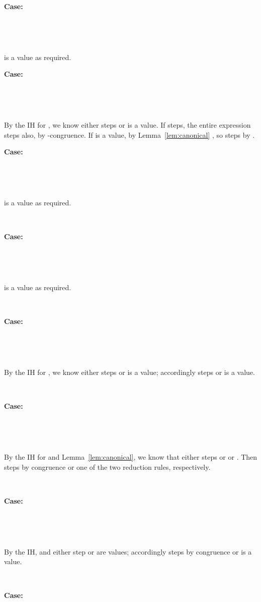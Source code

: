 \documentclass[copyright]{eptcs}
\begin{document}
\noindent \textbf{Case:}

\



\ 

\noindent  is a value as required.


\noindent \textbf{Case:}

\



\ 

\noindent By the IH for , we know  either steps or is a value. If  steps, the entire expression  steps also, by -congruence. If  is a value, by Lemma~\ref{lem:canonical} , so  steps by .

\noindent \textbf{Case:}

\



\

\noindent  is a value as required.

\ 

\noindent \textbf{Case:}

\



\ 

\noindent  is a value as required.

\ 

\noindent \textbf{Case:}

\



\ 

\noindent By the IH for , we know  either steps or is a value; accordingly  steps or is a value.

\ 

\noindent \textbf{Case:}

\



\ 

\noindent By the IH for  and Lemma~\ref{lem:canonical}, we know that either  steps or  or . Then  steps by congruence or one of the two reduction rules, respectively.


\ 

\noindent \textbf{Case:}

\



\ 

\noindent By the IH,  and  either step or are values; accordingly  steps by congruence or is a value.

\ 

\noindent \textbf{Case:}

\
\end{document}
